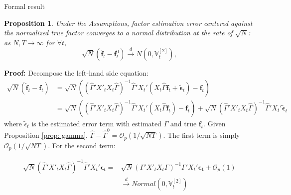\documentclass{beamer}
\newtheorem{proposition}{Proposition}
\begin{document}
\begin{frame}{Formal result}
\footnotesize
    \begin{proposition}
\label{prop: factor}
Under the Assumptions, factor estimation error centered against the normalized true factor converges to a normal distribution at the rate of $\sqrt{N}$: as $N, T \to \infty$ for $\forall t$,
$$
\sqrt{N}\left(\hat{\boldsymbol{f}}_t - \boldsymbol{f}^0_t\right) \xrightarrow{d} N\left(0, \mathbb{V}_t^{[2]}\right),
$$
\end{proposition}

\textbf{Proof:} Decompose the left-hand side equation:
\begin{equation*}
\begin{aligned}
\sqrt{N}\left(\boldsymbol{\hat{f}}_t - \boldsymbol{f}_t\right) &= \sqrt{N}\left(\left( \hat{\Gamma}'X'_tX_t\hat{\Gamma} \right)^{-1}\hat{\Gamma}'X_t' \left(X_t\hat{\Gamma}\boldsymbol{f}_t+ \boldsymbol{\tilde{\epsilon}}_t \right) - \boldsymbol{f}_t\right)\\
&= \sqrt{N}\left(\left( \hat{\Gamma}'X'_tX_t\hat{\Gamma} \right)^{-1}\hat{\Gamma}'X_t' \left(X_t \hat{\Gamma}\boldsymbol{f}_t\right) - \boldsymbol{f}_t\right) + \sqrt{N}\left( \hat{\Gamma}'X'_tX_t\hat{\Gamma} \right)^{-1}\hat{\Gamma}'X_t'\boldsymbol{\tilde{\epsilon}}_t
\end{aligned}
\end{equation*}
where $\tilde{\epsilon}_t$ is the estimated error term with estimated $\Gamma$ and true $\boldsymbol{f}_t$. Given Proposition \ref{prop: gamma}, $\hat{\Gamma} - \hat{\Gamma}^0 = \mathcal{O}_p \left( 1/\sqrt{NT} \right)$. The first term is simply $\mathcal{O}_p\left(1/\sqrt{NT}\right)$. For the second term:

\begin{equation*}
\begin{aligned}
\sqrt{N}\left( \hat{\Gamma}'X'_tX_t\hat{\Gamma} \right)^{-1}\hat{\Gamma}'X_t'\boldsymbol{\epsilon}_t = &\sqrt{N}\left( \Gamma'X'_tX_t\Gamma \right)^{-1}\Gamma'X_t'\boldsymbol{\epsilon_t} + \mathcal{O}_p(1) \\
& \xrightarrow{d} Normal(0, \mathbb{V}_t^{[2]})
\end{aligned}
\end{equation*}
\end{frame}
\end{document}

